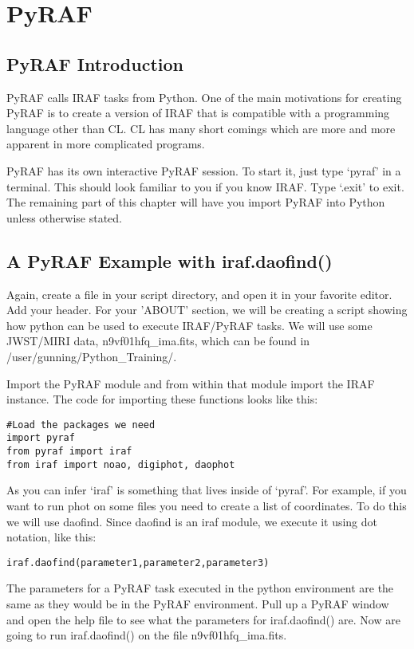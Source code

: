 \chapter{PyRAF}
\label{ch:pyraf}
 
\section{PyRAF Introduction}

PyRAF calls IRAF tasks from Python.  One of the main motivations for
creating PyRAF is to create a version of IRAF that is compatible with
a programming language other than CL. CL has many short comings which
are more and more apparent in more complicated programs.

PyRAF has its own interactive PyRAF session.  To start it, just type
`pyraf' in a terminal.  This should look familiar to you if you know
IRAF.  Type `.exit' to exit.  The remaining part of this chapter will
have you import PyRAF into Python unless otherwise stated.

\section{A PyRAF Example with {\sf iraf.daofind()}}

Again, create a file in your script directory, and open it in your
favorite editor.  Add your header.  For your 'ABOUT' section, we will
be creating a script showing how python can be used to execute
IRAF/PyRAF tasks. We will use some JWST/MIRI data, n9vf01hfq\_ima.fits,
which can be found in /user/gunning/Python_Training/.

Import the PyRAF module and from within that module import the IRAF
instance.  The code for importing these functions looks like this:

\begin{verbatim}
#Load the packages we need 
import pyraf 
from pyraf import iraf
from iraf import noao, digiphot, daophot
\end{verbatim}

As you can infer `iraf' is something that lives inside of `pyraf'.
For example, if you want to run {\sf\small phot} on some files you
need to create a list of coordinates.  To do this we will use
{\sf\small daofind}.  Since {\sf\small daofind} is an iraf module, we
execute it using dot notation, like this:

\texttt{iraf.daofind(parameter1,parameter2,parameter3)}

The parameters for a PyRAF task executed in the python environment are
the same as they would be in the PyRAF environment. Pull up a PyRAF
window and open the help file to see what the parameters for
{\sf\small iraf.daofind()} are. Now are going to run {\sf\small
  iraf.daofind()} on the file n9vf01hfq\_ima.fits.  


